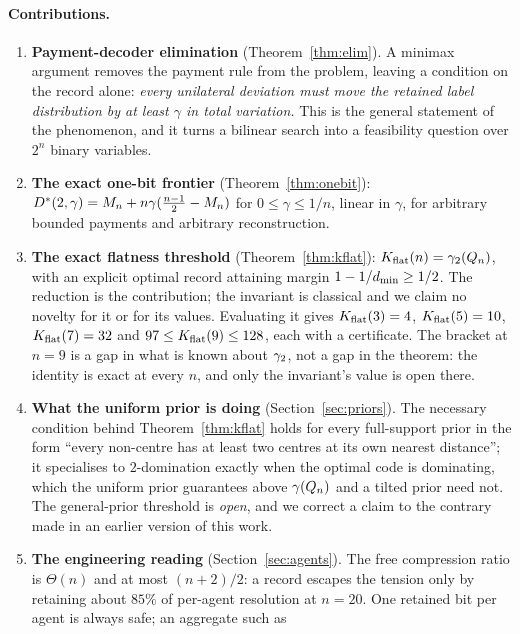 \paragraph{Contributions.}
\begin{enumerate}
\item \textbf{Payment-decoder elimination} (Theorem~\ref{thm:elim}). A minimax
      argument removes the payment rule from the problem, leaving a condition on
      the record alone: \emph{every unilateral deviation must move the retained
      label distribution by at least $\gamma$ in total variation.} This is the
      general statement of the phenomenon, and it turns a bilinear search into a
      feasibility question over $2^n$ binary variables.
\item \textbf{The exact one-bit frontier} (Theorem~\ref{thm:onebit}):
      $D^\ast(2,\gamma) = M_n + n\gamma(\frac{n-1}{2} - M_n)$ for
      $0 \le \gamma \le 1/n$, linear in $\gamma$, for arbitrary bounded payments
      and arbitrary reconstruction.
\item \textbf{The exact flatness threshold} (Theorem~\ref{thm:kflat}):
      $K_{\mathrm{flat}}(n) = \gamma_2(Q_n)$, with an explicit optimal record attaining margin
      $1 - 1/d_{\min} \ge 1/2$. The reduction is the contribution; the invariant is
      classical and we claim no novelty for it or for its values. Evaluating it
      gives $K_{\mathrm{flat}}(3)=4$, $K_{\mathrm{flat}}(5)=10$, $K_{\mathrm{flat}}(7)=32$ and
      $97 \le K_{\mathrm{flat}}(9) \le 128$, each with a certificate. The bracket at
      $n = 9$ is a gap in what is known about $\gamma_2$, not a gap in the
      theorem: the identity is exact at every $n$, and only the invariant's
      value is open there.
\item \textbf{What the uniform prior is doing}
      (Section~\ref{sec:priors}). The necessary condition behind
      Theorem~\ref{thm:kflat} holds for every full-support prior in the form
      ``every non-centre has at least two centres at its own nearest
      distance''; it specialises to $2$-domination exactly when the optimal
      code is dominating, which the uniform prior guarantees above
      $\gamma(Q_n)$ and a tilted prior need not. The general-prior threshold is
      \emph{open}, and we correct a claim to the contrary made in an earlier
      version of this work.
\item \textbf{The engineering reading} (Section~\ref{sec:agents}). The free
      compression ratio is $\Theta(n)$ and at most $(n+2)/2$: a record escapes
      the tension only by retaining about $85\%$ of per-agent resolution at
      $n = 20$. One retained bit per agent is always safe; an aggregate such as

\end{enumerate}
